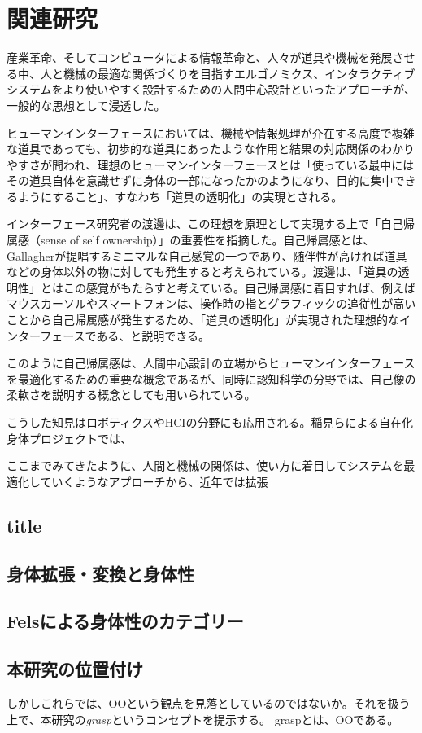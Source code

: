 \chapter{関連研究}
産業革命、そしてコンピュータによる情報革命と、人々が道具や機械を発展させる中、人と機械の最適な関係づくりを目指すエルゴノミクス、インタラクティブシステムをより使いやすく設計するための人間中心設計といったアプローチが、一般的な思想として浸透した。

ヒューマンインターフェースにおいては、機械や情報処理が介在する高度で複雑な道具であっても、初歩的な道具にあったような作用と結果の対応関係のわかりやすさが問われ、理想のヒューマンインターフェースとは「使っている最中にはその道具自体を意識せずに身体の一部になったかのようになり、目的に集中できるようにすること」、すなわち「道具の透明化」の実現とされる。

インターフェース研究者の渡邊\cite{Watanabe2017}は、この理想を原理として実現する上で「自己帰属感（sense of self ownership）」の重要性を指摘した。自己帰属感とは、Gallagher\cite{Gallagher2000}が提唱するミニマルな自己感覚の一つであり、随伴性が高ければ道具などの身体以外の物に対しても発生すると考えられている。渡邊は、「道具の透明性」とはこの感覚がもたらすと考えている\cite{Watanabe2003}。自己帰属感に着目すれば、例えばマウスカーソルやスマートフォンは、操作時の指とグラフィックの追従性が高いことから自己帰属感が発生するため、「道具の透明化」が実現された理想的なインターフェースである、と説明できる。

このように自己帰属感は、人間中心設計の立場からヒューマンインターフェースを最適化するための重要な概念であるが、同時に認知科学の分野では、自己像の柔軟さを説明する概念としても用いられている。

こうした知見はロボティクスやHCIの分野にも応用される。稲見らによる自在化身体プロジェクトでは、

ここまでみてきたように、人間と機械の関係は、使い方に着目してシステムを最適化していくようなアプローチから、近年では拡張

\section{title}
\section{身体拡張・変換と身体性}
\section{Felsによる身体性のカテゴリー}
\section{本研究の位置付け}
しかしこれらでは、OOという観点を見落としているのではないか。それを扱う上で、本研究の\textit{grasp}というコンセプトを提示する。
graspとは、OOである。